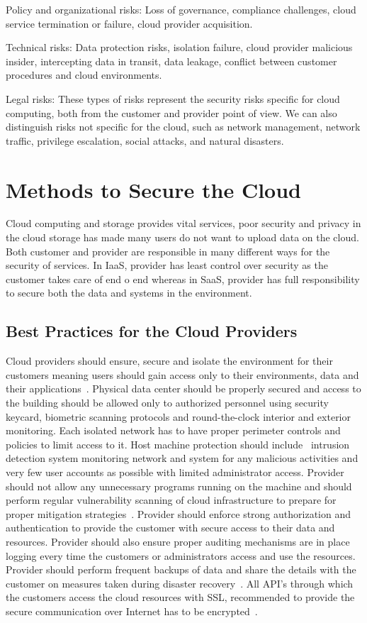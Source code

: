     Policy and organizational risks: Loss of governance, compliance challenges, 
cloud service termination or failure, cloud provider acquisition.

    Technical risks: Data protection risks, isolation failure, cloud provider 
malicious insider, intercepting data in transit, data leakage, conflict 
between customer procedures and cloud environments.

    Legal risks: These types of risks represent the security risks specific 
for cloud computing, both from the customer and provider point of view. 
We can also distinguish risks not specific for the cloud, such as network 
management, network traffic, privilege escalation, social attacks, and 
natural disasters.

\section{Methods to Secure the Cloud}
Cloud computing and storage provides vital services, poor security and 
privacy in the cloud storage has made many users do not want to 
upload data on the cloud. Both customer and provider are responsible in many
different ways for the security of services. In IaaS, provider has least control
over security as the customer takes care of end o end whereas in SaaS, provider
has full responsibility to secure both the data and systems in the environment.

\subsection{Best Practices for the Cloud Providers}
Cloud providers should ensure, secure and isolate the environment for their 
customers meaning users should gain access only to their environments, data
and their applications~\cite{hid-sp18-513-vmware}. Physical data center should be properly secured 
and access to the building should be allowed only to authorized personnel 
using security keycard, biometric scanning protocols and round-the-clock
interior and exterior monitoring. Each isolated network has to have proper 
perimeter controls and policies to limit access to it.
Host machine protection should include~\cite{hid-sp18-513-diversity} intrusion detection system 
monitoring network and system for any malicious activities and very 
few user accounts as possible with limited administrator access. Provider
should not allow any unnecessary programs running on the machine and should 
perform regular vulnerability scanning of cloud infrastructure to prepare 
for proper mitigation strategies~\cite{hid-sp18-513-winkler}. Provider should enforce strong 
authorization and authentication to provide the customer with secure access 
to their data and resources. Provider should also ensure proper auditing 
mechanisms are in place logging every time the customers or administrators
access and use the resources. Provider should perform frequent backups of 
data and share the details with the customer on measures taken during 
disaster recovery~\cite{hid-sp18-513-vmware}. All API's through which the customers access
the cloud resources with SSL, recommended to provide the secure
communication over Internet has to be encrypted~\cite{hid-sp18-513-diversity}.

